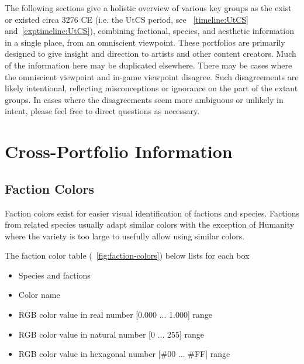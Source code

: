 \label{chapt:portfolios}
The following sections give a holistic overview of various key groups
as the exist or existed circa 3276 CE (i.e. the UtCS period, see
~\ref{timeline:UtCS} and~\ref{exptimeline:UtCS}), combining factional, species, and aesthetic
information in a single place, from an omniscient viewpoint. These
portfolios are primarily designed to give insight and direction to
artists and other content creators. Much of the information here may
be duplicated elsewhere. There may be cases where the omniscient
viewpoint and in-game viewpoint disagree. Such disagreements are
likely intentional, reflecting misconceptions or ignorance on the
part of the extant groups. In cases where the disagreements seem more
ambiguous or unlikely in intent, please feel free to direct questions
as necessary.

\section{Cross-Portfolio Information}

\subsection{Faction Colors}

Faction colors exist for easier visual identification of factions and species. Factions from related species usually adapt similar colors with the exception of Humanity where the variety is too large to usefully allow using similar colors.

The faction color table (~\ref{fig:faction-colors}) below lists for each box

\begin{itemize}
\item Species and factions
\item Color name
\item RGB color value in real number [0.000 ... 1.000] range
\item RGB color value in natural number [0 ... 255] range
\item RGB color value in hexagonal number [\#00 ... \#FF] range
\end{itemize}

